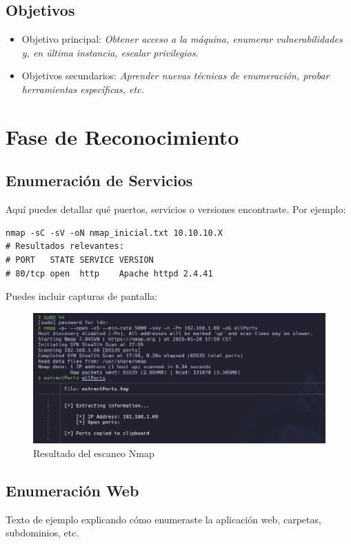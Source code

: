 \documentclass[12pt,a4paper]{report}
\begin{document}
\section{Objetivos}
\begin{itemize}
    \item Objetivo principal: \textit{Obtener acceso a la máquina, enumerar vulnerabilidades y, en última instancia, escalar privilegios}.
    \item Objetivos secundarios: \textit{Aprender nuevas técnicas de enumeración, probar herramientas específicas, etc.}
\end{itemize}

\chapter{Fase de Reconocimiento}

\section{Enumeración de Servicios}
Aquí puedes detallar qué puertos, servicios o versiones encontraste. Por ejemplo:
\begin{verbatim}
nmap -sC -sV -oN nmap_inicial.txt 10.10.10.X
# Resultados relevantes:
# PORT   STATE SERVICE VERSION
# 80/tcp open  http    Apache httpd 2.4.41
\end{verbatim}

Puedes incluir capturas de pantalla:

\begin{figure}[H]
    \centering
    \includegraphics[width=0.75\linewidth]{images/placeholder_nmap.png}
    \caption{Resultado del escaneo Nmap}
    \label{fig:nmap-scan}
\end{figure}

\section{Enumeración Web}
Texto de ejemplo explicando cómo enumeraste la aplicación web, carpetas, subdominios, etc.
\end{document}
